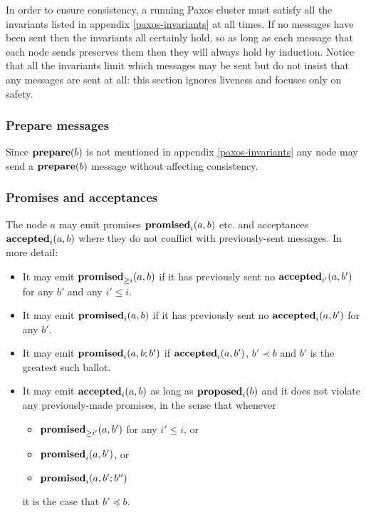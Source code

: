 \documentclass[journal]{IEEEtran}
\begin{document}
In order to ensure consistency, a running Paxos cluster must satisfy all the
invariants listed in appendix \ref{paxos-invariants} at all times. If no
messages have been sent then the invariants all certainly hold, so as long as
each message that each node sends preserves them then they will always hold by
induction. Notice that all the invariants limit which messages may be sent but
do not insist that any messages are sent at all: this section ignores liveness
and focuses only on safety.

\subsubsection{Prepare messages} Since $\mathbf{prepare}(b)$ is not mentioned in appendix
\ref{paxos-invariants} any node may send a $\mathbf{prepare}(b)$ message without affecting
consistency.

\subsubsection{Promises and acceptances} The node $a$ may emit promises
$\mathbf{promised}_{i}(a,b)$ etc. and acceptances $\mathbf{accepted}_{i}(a,b)$ where they do not
conflict with previously-sent messages. In more detail: \begin{itemize} \item
It may emit $\mathbf{promised}_{\ge i}(a,b)$ if it has previously sent no $\mathbf{accepted}_{i'}(a,b')$
for any $b'$ and any $i' \le i$. \item It may emit $\mathbf{promised}_{i}(a,b)$ if it has
previously sent no $\mathbf{accepted}_{i}(a,b')$ for any $b'$. \item It may emit
$\mathbf{promised}_{i}(a,b;b')$ if $\mathbf{accepted}_{i}(a,b')$, $b' \prec b$ and $b'$ is the
greatest such ballot. \item It may emit $\mathbf{accepted}_{i}(a,b)$ as long as
$\mathbf{proposed}_{i}(b)$ and it does not violate any previously-made promises, in the
sense that whenever \begin{itemize} \item $\mathbf{promised}_{\ge i'}(a,b')$ for any $i' \le
i$, or \item $\mathbf{promised}_{i}(a,b')$, or \item $\mathbf{promised}_{i}(a,b';b'')$\end{itemize}
it is the case that $b' \preceq b$. \end{itemize}
\end{document}
